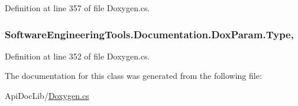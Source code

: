 Definition at line 357 of file Doxygen.\+cs.

\hypertarget{class_software_engineering_tools_1_1_documentation_1_1_dox_param_ac303701ced7c1c167212c7e7a9724781}{
\subsubsection[{Type}]{ Software\+Engineering\+Tools.\+Documentation.\+Dox\+Param.\+Type\hspace{0.3cm}{\ttfamily [get]}, {\ttfamily [set]}}}\label{class_software_engineering_tools_1_1_documentation_1_1_dox_param_ac303701ced7c1c167212c7e7a9724781}


Definition at line 352 of file Doxygen.\+cs.



The documentation for this class was generated from the following file\+:\begin{DoxyCompactItemize}
\item 
Api\+Doc\+Lib/\hyperlink{_doxygen_8cs}{Doxygen.\+cs}\end{DoxyCompactItemize}
